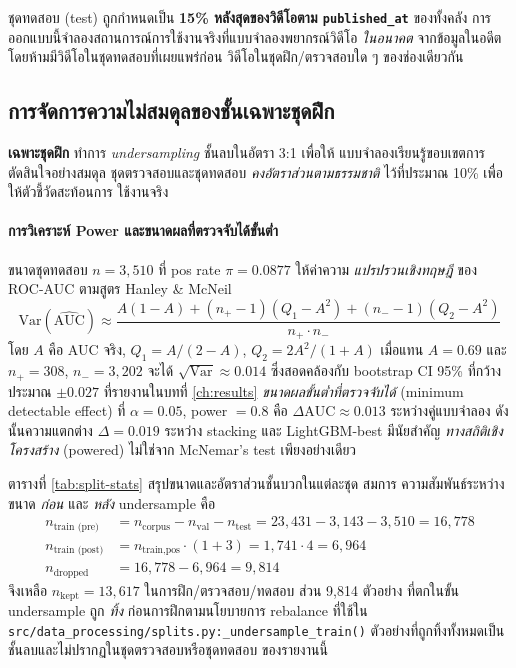 ชุดทดสอบ (test) ถูกกำหนดเป็น \textbf{15\% หลังสุดของวิดีโอตาม \texttt{published\_at}}
ของทั้งคลัง การออกแบบนี้จำลองสถานการณ์การใช้งานจริงที่แบบจำลองพยากรณ์วิดีโอ
\emph{ในอนาคต} จากข้อมูลในอดีต โดยห้ามมีวิดีโอในชุดทดสอบที่เผยแพร่ก่อน
วิดีโอในชุดฝึก/ตรวจสอบใด ๆ ของช่องเดียวกัน

\subsection{การจัดการความไม่สมดุลของชั้นเฉพาะชุดฝึก}

\textbf{เฉพาะชุดฝึก} ทำการ \emph{undersampling} ชั้นลบในอัตรา 3:1 เพื่อให้
แบบจำลองเรียนรู้ขอบเขตการตัดสินใจอย่างสมดุล ชุดตรวจสอบและชุดทดสอบ
\emph{คงอัตราส่วนตามธรรมชาติ} ไว้ที่ประมาณ 10\% เพื่อให้ตัวชี้วัดสะท้อนการ
ใช้งานจริง

\paragraph{การวิเคราะห์ Power และขนาดผลที่ตรวจจับได้ขั้นต่ำ}
ขนาดชุดทดสอบ $n = 3{,}510$ ที่ pos rate $\pi = 0.0877$ ให้ค่าความ
\emph{แปรปรวนเชิงทฤษฎี} ของ ROC-AUC ตามสูตร Hanley \& McNeil
\begin{equation}
\mathrm{Var}(\widehat{\mathrm{AUC}}) \approx \frac{A(1-A) + (n_+ - 1)(Q_1 - A^2) + (n_- - 1)(Q_2 - A^2)}{n_+ \cdot n_-}
\label{eq:hanley-mcneil}
\end{equation}
โดย $A$ คือ AUC จริง, $Q_1 = A/(2-A)$, $Q_2 = 2A^2/(1+A)$ เมื่อแทน $A=0.69$
และ $n_+ = 308$, $n_- = 3{,}202$ จะได้ $\sqrt{\mathrm{Var}} \approx 0.014$
ซึ่งสอดคล้องกับ bootstrap CI 95\% ที่กว้างประมาณ $\pm 0.027$ ที่รายงานในบทที่
\ref{ch:results} \emph{ขนาดผลขั้นต่ำที่ตรวจจับได้} (minimum detectable effect)
ที่ $\alpha = 0.05$, power $= 0.8$ คือ $\Delta\mathrm{AUC} \approx 0.013$
ระหว่างคู่แบบจำลอง ดังนั้นความแตกต่าง $\Delta = 0.019$ ระหว่าง stacking และ
LightGBM-best มีนัยสำคัญ \emph{ทางสถิติเชิงโครงสร้าง} (powered) ไม่ใช่จาก
McNemar's test เพียงอย่างเดียว

ตารางที่ \ref{tab:split-stats} สรุปขนาดและอัตราส่วนชั้นบวกในแต่ละชุด สมการ
ความสัมพันธ์ระหว่างขนาด \emph{ก่อน} และ \emph{หลัง} undersample คือ
\begin{align}
n_{\text{train (pre)}} &= n_{\text{corpus}} - n_{\text{val}} - n_{\text{test}}
                       = 23{,}431 - 3{,}143 - 3{,}510 = 16{,}778 \\
n_{\text{train (post)}} &= n_{\text{train,pos}} \cdot (1 + 3) = 1{,}741 \cdot 4 = 6{,}964 \\
n_{\text{dropped}} &= 16{,}778 - 6{,}964 = 9{,}814
\end{align}
จึงเหลือ $n_{\text{kept}} = 13{,}617$ ในการฝึก/ตรวจสอบ/ทดสอบ ส่วน 9{,}814 ตัวอย่าง
ที่ตกในขั้น undersample ถูก \emph{ทิ้ง} ก่อนการฝึกตามนโยบายการ rebalance
ที่ใช้ใน \texttt{src/data\_processing/splits.py:\_undersample\_train()}
ตัวอย่างที่ถูกทิ้งทั้งหมดเป็นชั้นลบและไม่ปรากฏในชุดตรวจสอบหรือชุดทดสอบ
ของรายงานนี้

